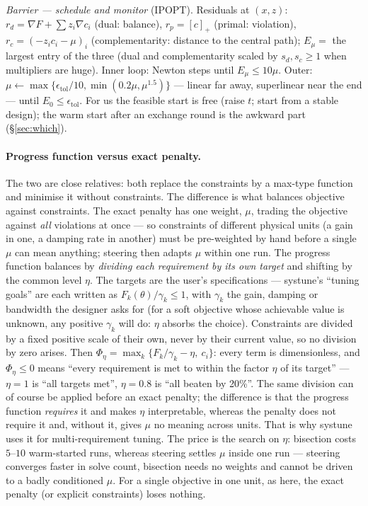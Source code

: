 \documentclass[11pt,a4paper]{article}
\newcommand{\revb}[1]{#1}
\newcommand{\revc}[1]{#1}
\begin{document}
\emph{Barrier --- schedule and monitor} (IPOPT).  Residuals at $(x,z)$:
$r_d=\nabla F+\sum z_i\nabla c_i$ (dual: balance), $r_p=[c]_+$ (primal: violation),
$r_c=(-z_ic_i-\mu)_i$ (complementarity: distance to the central path);
$E_\mu=$ the largest entry of the three (dual and complementarity scaled by
$s_d,s_c\ge1$ when multipliers are huge).  Inner loop: Newton steps until
$E_\mu\le10\mu$.  Outer: $\mu\leftarrow\max\{\epsilon_{\mathrm{tol}}/10,
\min(0.2\mu,\mu^{1.5})\}$ --- linear far away, superlinear near the end --- until
$E_0\le\epsilon_{\mathrm{tol}}$.  For us the feasible start is free (raise $t$; start
from a stable design); the warm start after an exchange round is the awkward part
(\S\ref{sec:which}).

\revb{\paragraph{Progress function versus exact penalty.}  The two are close relatives:
both replace the constraints by a max-type function and minimise it without constraints.
The difference is what balances objective against constraints.  The exact penalty has
one weight, $\mu$, trading the objective against \emph{all} violations at once --- so
constraints of different physical units (a gain in one, a damping rate in another) must
be pre-weighted by hand before a single $\mu$ can mean anything; steering then adapts
$\mu$ within one run.  \revc{The progress function balances by \emph{dividing each requirement by its own
target} and shifting by the common level $\eta$.  The targets are the user's
specifications --- systune's ``tuning goals'' are each written as $F_k(\theta)/\gamma_k\le1$,
with $\gamma_k$ the gain, damping or bandwidth the designer asks for (for a
soft objective whose achievable value is unknown, any positive $\gamma_k$ will do: $\eta$
absorbs the choice).  Constraints are divided by a fixed positive scale of their own,
never by their current value, so no division by zero arises.  Then
$\Phi_\eta=\max_k\{F_k/\gamma_k-\eta,\ c_i\}$: every term is dimensionless, and
$\Phi_\eta\le0$ means ``every requirement is met to within the factor $\eta$ of its
target'' --- $\eta=1$ is ``all targets met'', $\eta=0.8$ is ``all beaten by 20\%''.  The
same division can of course be applied before an exact penalty; the difference is that
the progress function \emph{requires} it and makes $\eta$ interpretable, whereas the
penalty does not require it and, without it, gives $\mu$ no meaning across units.  That
is why systune uses it for multi-requirement tuning.}  The price is the search on $\eta$:
bisection costs $5$--$10$ warm-started runs, whereas steering settles $\mu$ inside one
run --- steering converges faster in solve count, bisection needs no weights and cannot
be driven to a badly conditioned $\mu$.  For a single objective in one unit, as here,
the exact penalty (or explicit constraints) loses nothing.}
\end{document}
